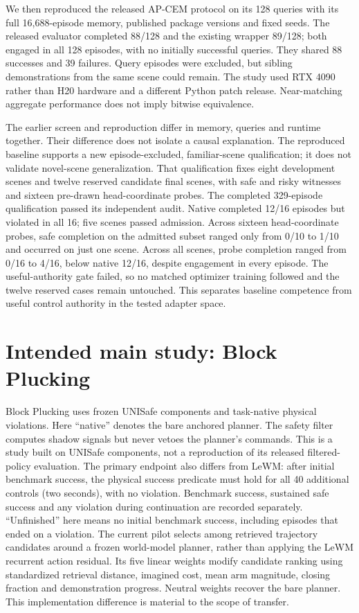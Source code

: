 \documentclass[sigconf,nonacm]{acmart}
\begin{document}
We then reproduced the released AP-CEM protocol on its 128 queries with its full
16,688-episode memory, published package versions and fixed seeds. The released
evaluator completed 88/128 and the existing wrapper 89/128; both engaged in all
128 episodes, with no initially successful queries. They shared 88 successes and
39 failures. Query episodes were excluded, but sibling demonstrations from the
same scene could remain. The study used RTX 4090 rather than H20 hardware and a
different Python patch release. Near-matching aggregate performance does not imply
bitwise equivalence.

The earlier screen and reproduction differ in memory, queries and runtime together.
Their difference does not isolate a causal explanation. The reproduced baseline
supports a new episode-excluded, familiar-scene qualification; it does not validate
novel-scene generalization. That qualification fixes eight development scenes and
twelve reserved candidate final scenes, with safe and risky witnesses and sixteen
pre-drawn head-coordinate probes. The completed 329-episode qualification passed its independent audit. Native
completed 12/16 episodes but violated in all 16; five scenes passed admission.
Across sixteen head-coordinate probes, safe completion on the admitted subset
ranged only from 0/10 to 1/10 and occurred on just one scene. Across all scenes,
probe completion ranged from 0/16 to 4/16, below native 12/16, despite engagement
in every episode. The useful-authority gate failed, so no matched optimizer
training followed and the twelve reserved cases remain untouched. This separates
baseline competence from useful control authority in the tested adapter space.

\section{Intended main study: Block Plucking}
Block Plucking uses frozen UNISafe components and task-native physical violations.
Here ``native'' denotes the bare anchored planner. The safety filter computes
shadow signals but never vetoes the planner's commands. This is a study built on
UNISafe components, not a reproduction of its released filtered-policy evaluation.
The primary endpoint also differs from LeWM: after initial benchmark success,
the physical success predicate must hold for all 40 additional controls (two
seconds), with no violation. Benchmark success, sustained safe success and any
violation during continuation are recorded separately. ``Unfinished'' here means
no initial benchmark success, including episodes that ended on a violation.
The current pilot selects among retrieved trajectory candidates around a frozen
world-model planner, rather than applying the LeWM recurrent action residual.
Its five linear weights modify candidate ranking using standardized retrieval
distance, imagined cost, mean arm magnitude, closing fraction and demonstration
progress. Neutral weights recover the bare planner. This implementation difference
is material to the scope of transfer.
\end{document}
